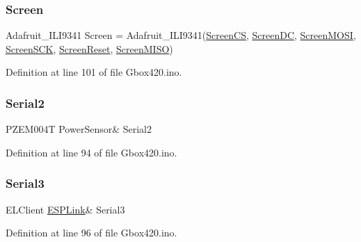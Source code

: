 \mbox{\label{_gbox420_8ino_aa942dbfbc8706161b88870d67954906e}} 
\subsubsection{\texorpdfstring{Screen}{Screen}}
{\footnotesize\ttfamily Adafruit\+\_\+\+I\+L\+I9341 Screen = Adafruit\+\_\+\+I\+L\+I9341(\mbox{\hyperlink{420_pins_8h_a65916b6065e3b5d98448b979123158c9}{Screen\+CS}}, \mbox{\hyperlink{420_pins_8h_ab09e1b852e54f2f0747abfae1f63aa2b}{Screen\+DC}}, \mbox{\hyperlink{420_pins_8h_ab90bca7e74b9865786115e4d36957345}{Screen\+M\+O\+SI}}, \mbox{\hyperlink{420_pins_8h_a1ed58e1cf5ac44ce8b14a16ca301f4c3}{Screen\+S\+CK}}, \mbox{\hyperlink{420_pins_8h_a4e4d5f7435dbe76a52b878cf1e5460e6}{Screen\+Reset}}, \mbox{\hyperlink{420_pins_8h_abe77e19b4b421b1951404c107bf971c0}{Screen\+M\+I\+SO}})}



Definition at line 101 of file Gbox420.\+ino.

\mbox{\label{_gbox420_8ino_a087076c54fe131098d9aa5703ccefac7}} 
\subsubsection{\texorpdfstring{Serial2}{Serial2}}
{\footnotesize\ttfamily P\+Z\+E\+M004T Power\+Sensor\& Serial2}



Definition at line 94 of file Gbox420.\+ino.

\mbox{\label{_gbox420_8ino_ae6cf0a4b7926494122c35468c7f1ac7e}} 
\subsubsection{\texorpdfstring{Serial3}{Serial3}}
{\footnotesize\ttfamily E\+L\+Client \mbox{\hyperlink{_gbox420_8ino_ab3b574c627e04e5023952f501e269a06}{E\+S\+P\+Link}}\& Serial3}



Definition at line 96 of file Gbox420.\+ino.

\mbox{\label{_gbox420_8ino_a6efffa16bd9cffe1ac626d2c5a73113e}} 
